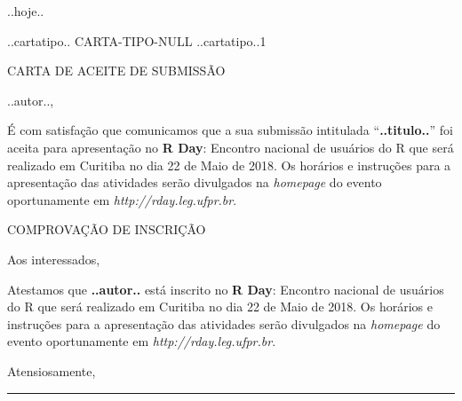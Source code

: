 \documentclass[a4paper, 11pt]{letter}
\date{}
\def\DATA{..hoje..}
\def\CARTATIPO{..cartatipo..} %
\def\AUTOR{..autor..}         %
\def\TITULO{..titulo..}       %
\def\FECHAMENTO{Atensiosamente,}
\def\COMPLEMENTO{
  no \textbf{R Day}: Encontro nacional de usuários do R que será
  realizado em Curitiba no dia 22 de Maio de 2018.  Os horários e
  instruções para a apresentação das atividades serão divulgados na
  \textit{homepage} do evento oportunamente em
  \textit{http://rday.leg.ufpr.br}.
}
\begin{document}
\begin{letter}{}

  \hfill \DATA \vspace{1em}

  \ifx\CARTATIPO\undefined %
  CARTA-TIPO-NULL
  \else
  \if\CARTATIPO1
  \begin{center}
    \uppercase{Carta de Aceite de Submissão}
  \end{center}

  \opening{\AUTOR,}

  \vspace{1em}

  \hspace{1.5cm}
  É com satisfação que comunicamos que a sua submissão intitulada
  ``\textbf{\TITULO}'' foi aceita para apresentação \COMPLEMENTO

  \else

  \begin{center}
    \uppercase{Comprovação de Inscrição}
  \end{center}

  \opening{Aos interessados,}

  \vspace{1em}

  \hspace{1.5cm}
  Atestamos que \textbf{\AUTOR} está inscrito \COMPLEMENTO

  \fi
  \fi

  \vspace{2em}
  \hspace{1.5cm} \FECHAMENTO
  \vspace{2em}

  \pagestyle{fancy}
  \thispagestyle{fancy}

  \begin{minipage}[b]{0.45\linewidth}

    \vspace*{2em}
    \vspace*{-6em}

    \begin{flushright}
      \rule{\textwidth}{0.5pt}


\end{flushright}
\end{minipage}
\end{letter}
\end{document}
